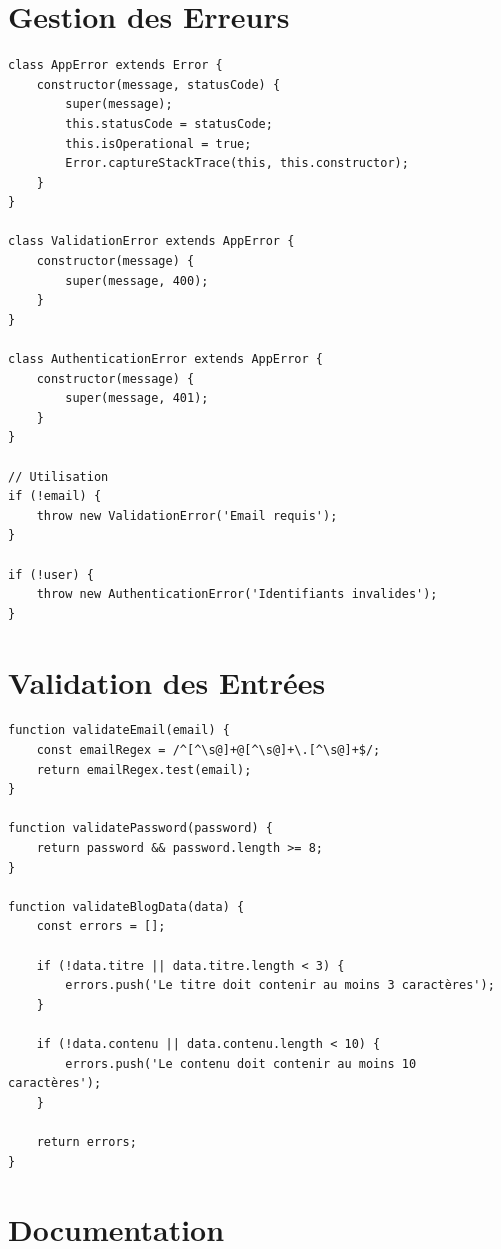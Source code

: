 \section{Gestion des Erreurs}

\begin{lstlisting}[style=javascript, caption=Gestion structurée des erreurs]
class AppError extends Error {
    constructor(message, statusCode) {
        super(message);
        this.statusCode = statusCode;
        this.isOperational = true;
        Error.captureStackTrace(this, this.constructor);
    }
}

class ValidationError extends AppError {
    constructor(message) {
        super(message, 400);
    }
}

class AuthenticationError extends AppError {
    constructor(message) {
        super(message, 401);
    }
}

// Utilisation
if (!email) {
    throw new ValidationError('Email requis');
}

if (!user) {
    throw new AuthenticationError('Identifiants invalides');
}
\end{lstlisting}

\section{Validation des Entrées}

\begin{lstlisting}[style=javascript, caption=Validation des entrées]
function validateEmail(email) {
    const emailRegex = /^[^\s@]+@[^\s@]+\.[^\s@]+$/;
    return emailRegex.test(email);
}

function validatePassword(password) {
    return password && password.length >= 8;
}

function validateBlogData(data) {
    const errors = [];
    
    if (!data.titre || data.titre.length < 3) {
        errors.push('Le titre doit contenir au moins 3 caractères');
    }
    
    if (!data.contenu || data.contenu.length < 10) {
        errors.push('Le contenu doit contenir au moins 10 caractères');
    }
    
    return errors;
}
\end{lstlisting}

\section{Documentation}

